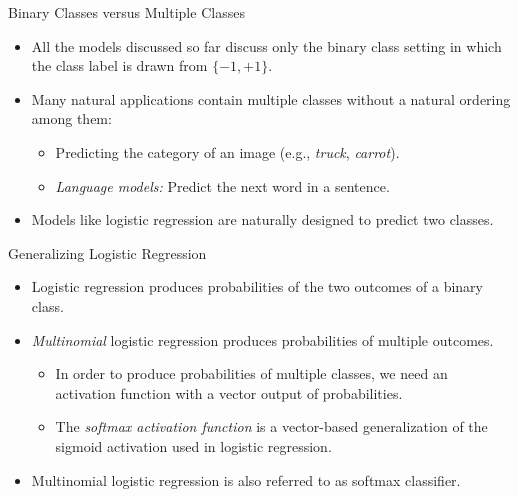 \begin{frame}{Binary Classes versus Multiple Classes}
\begin{itemize}
\item All the models discussed so far discuss only the binary class
setting in which the class label is drawn from $\{ -1, +1 \}$.
\item Many natural applications contain  multiple classes without a natural ordering among them:
\begin{itemize}
\item Predicting the category of an image (e.g., {\em truck},
{\em carrot}).
\item {\em Language models:} Predict the next word in a sentence.
\end{itemize}
\item Models like logistic regression are naturally designed to predict two classes.
\end{itemize}
\end{frame}


\begin{frame}{Generalizing Logistic Regression}
\begin{itemize}
\item Logistic regression produces probabilities of the two outcomes
of a binary class.
\item {\em Multinomial} logistic regression  produces probabilities
of multiple outcomes.
\begin{itemize}
\item In order to produce probabilities of multiple classes, we need
an activation function with a vector output of probabilities.
\item The {\em softmax activation function} is a vector-based
generalization of the sigmoid activation used in logistic
regression.
\end{itemize}
\item Multinomial logistic regression is also referred to as softmax classifier.
\end{itemize}
\end{frame}


